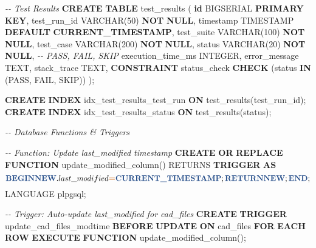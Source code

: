 \documentclass[
]{article}
\newenvironment{Shaded}{\begin{snugshade}}{\end{snugshade}}
\newcommand{\CommentTok}[1]{\textcolor[rgb]{0.56,0.35,0.01}{\textit{#1}}}
\newcommand{\ControlFlowTok}[1]{\textcolor[rgb]{0.13,0.29,0.53}{\textbf{#1}}}
\newcommand{\DataTypeTok}[1]{\textcolor[rgb]{0.13,0.29,0.53}{#1}}
\newcommand{\DecValTok}[1]{\textcolor[rgb]{0.00,0.00,0.81}{#1}}
\newcommand{\FunctionTok}[1]{\textcolor[rgb]{0.13,0.29,0.53}{\textbf{#1}}}
\newcommand{\KeywordTok}[1]{\textcolor[rgb]{0.13,0.29,0.53}{\textbf{#1}}}
\newcommand{\NormalTok}[1]{#1}
\newcommand{\OperatorTok}[1]{\textcolor[rgb]{0.81,0.36,0.00}{\textbf{#1}}}
\newcommand{\StringTok}[1]{\textcolor[rgb]{0.31,0.60,0.02}{#1}}
\begin{document}
\begin{Shaded}
\begin{Highlighting}[]
\CommentTok{{-}{-} Test Results}
\KeywordTok{CREATE} \KeywordTok{TABLE}\NormalTok{ test\_results (}
    \KeywordTok{id}\NormalTok{ BIGSERIAL }\KeywordTok{PRIMARY} \KeywordTok{KEY}\NormalTok{,}
\NormalTok{    test\_run\_id }\DataTypeTok{VARCHAR}\NormalTok{(}\DecValTok{50}\NormalTok{) }\KeywordTok{NOT} \KeywordTok{NULL}\NormalTok{,}
    \DataTypeTok{timestamp} \DataTypeTok{TIMESTAMP} \KeywordTok{DEFAULT} \FunctionTok{CURRENT\_TIMESTAMP}\NormalTok{,}
\NormalTok{    test\_suite }\DataTypeTok{VARCHAR}\NormalTok{(}\DecValTok{100}\NormalTok{) }\KeywordTok{NOT} \KeywordTok{NULL}\NormalTok{,}
\NormalTok{    test\_case }\DataTypeTok{VARCHAR}\NormalTok{(}\DecValTok{200}\NormalTok{) }\KeywordTok{NOT} \KeywordTok{NULL}\NormalTok{,}
\NormalTok{    status }\DataTypeTok{VARCHAR}\NormalTok{(}\DecValTok{20}\NormalTok{) }\KeywordTok{NOT} \KeywordTok{NULL}\NormalTok{,  }\CommentTok{{-}{-} PASS, FAIL, SKIP}
\NormalTok{    execution\_time\_ms }\DataTypeTok{INTEGER}\NormalTok{,}
\NormalTok{    error\_message TEXT,}
\NormalTok{    stack\_trace TEXT,}
    \KeywordTok{CONSTRAINT}\NormalTok{ status\_check }\KeywordTok{CHECK}\NormalTok{ (status }\KeywordTok{IN}\NormalTok{ (}\StringTok{\textquotesingle{}PASS\textquotesingle{}}\NormalTok{, }\StringTok{\textquotesingle{}FAIL\textquotesingle{}}\NormalTok{, }\StringTok{\textquotesingle{}SKIP\textquotesingle{}}\NormalTok{))}
\NormalTok{);}

\KeywordTok{CREATE} \KeywordTok{INDEX}\NormalTok{ idx\_test\_results\_test\_run }\KeywordTok{ON}\NormalTok{ test\_results(test\_run\_id);}
\KeywordTok{CREATE} \KeywordTok{INDEX}\NormalTok{ idx\_test\_results\_status }\KeywordTok{ON}\NormalTok{ test\_results(status);}

\CommentTok{{-}{-} Database Functions \& Triggers}

\CommentTok{{-}{-} Function: Update last\_modified timestamp}
\KeywordTok{CREATE} \KeywordTok{OR} \KeywordTok{REPLACE} \KeywordTok{FUNCTION}\NormalTok{ update\_modified\_column()}
\NormalTok{RETURNS }\KeywordTok{TRIGGER} \KeywordTok{AS}\NormalTok{ $$}
\ControlFlowTok{BEGIN}
    \KeywordTok{NEW}\NormalTok{.last\_modified }\OperatorTok{=} \FunctionTok{CURRENT\_TIMESTAMP}\NormalTok{;}
    \KeywordTok{RETURN} \KeywordTok{NEW}\NormalTok{;}
\ControlFlowTok{END}\NormalTok{;}
\NormalTok{$$ LANGUAGE plpgsql;}

\CommentTok{{-}{-} Trigger: Auto{-}update last\_modified for cad\_files}
\KeywordTok{CREATE} \KeywordTok{TRIGGER}\NormalTok{ update\_cad\_files\_modtime}
\KeywordTok{BEFORE} \KeywordTok{UPDATE} \KeywordTok{ON}\NormalTok{ cad\_files}
\ControlFlowTok{FOR} \KeywordTok{EACH} \KeywordTok{ROW}
\KeywordTok{EXECUTE} \KeywordTok{FUNCTION}\NormalTok{ update\_modified\_column();}


\end{Highlighting}
\end{Shaded}
\end{document}
